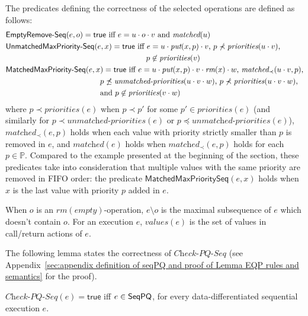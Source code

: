 The predicates defining the correctness of the selected operations are defined as follows:
\begin{align*}
&\mathsf{EmptyRemove\text{-}Seq}(e,o)=\mathsf{true} \mbox{ iff  $e= u\cdot o\cdot v$ and $\textit{matched}(u)$} \\
&\mathsf{UnmatchedMaxPriority\text{-}Seq}(e,x)=\mathsf{true}  \mbox{ iff  $e= u\cdot \textit{put}(x,p)\cdot v$, $p\not\prec \textit{priorities}(u\cdot v)$,} \\
&\hspace{6.4cm}p\not\in \textit{priorities}(v) \\
&\mathsf{MatchedMaxPriority\text{-}Seq}(e,x)=\mathsf{true} \mbox{ iff  $e= u\cdot \textit{put}(x,p)\cdot v\cdot \textit{rm}(x)\cdot w$, $\textit{matched}_\prec(u\cdot v,p)$,} \\
&\hspace{4.3cm}\mbox{$p\not\preceq \textit{unmatched-priorities}(u\cdot v\cdot w)$, $p\not\prec \textit{priorities}(u\cdot v\cdot w)$,} \\
&\hspace{4.3cm}\mbox{and  $p\not\in \textit{priorities}(v\cdot w)$}
\end{align*}
where $p\prec \textit{priorities}(e)$ when $p\prec p'$ for some $p'\in \textit{priorities}(e)$ (and similarly for $p\prec \textit{unmatched-priorities}(e)$ or $p\preceq \textit{unmatched-priorities}(e)$),
$\textit{matched}_\prec(e,p)$ holds when each value with priority strictly smaller than $p$ is removed in $e$, and $\textit{matched}(e)$ holds when $\textit{matched}_\prec(e,p)$ holds for each $p\in\mathbb{P}$. Compared to the example presented at the beginning of the section, these predicates take into consideration that multiple values with the same priority are removed in FIFO order: the predicate $\mathsf{MatchedMaxPrioritySeq}(e,x)$ holds when $x$ is the last value with priority $p$ added in $e$.

When $o$ is an $\textit{rm}(\textit{empty})$-operation, $e\setminus o$ is the maximal subsequence of $e$ which doesn't contain $o$. For an execution $e$, $\textit{values}(e)$ is the set of values  in call/return actions of $e$.





The following lemma states the correctness of $\textit{Check-PQ-Seq}$ (see Appendix~\ref{sec:appendix definition of seqPQ and proof of Lemma EQP rules and semantics} for the proof).

\begin{lemma}
\label{lemma:EPQ rules and semantics}
$\textit{Check-PQ-Seq}(e)=\mathsf{true}$ iff $e\in \mathsf{SeqPQ}$, for every data-differentiated sequential execution $e$.
\end{lemma}




